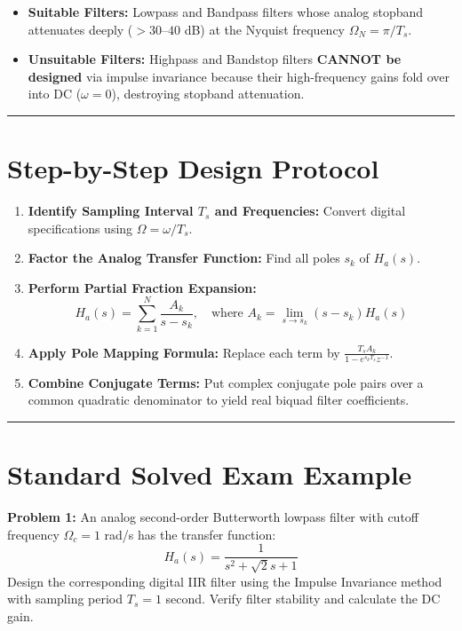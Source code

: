 \documentclass[11pt,a4paper]{article}
\begin{document}
\begin{itemize}
    \item \textbf{Suitable Filters:} Lowpass and Bandpass filters whose analog stopband attenuates deeply ($> 30\text{--}40$ dB) at the Nyquist frequency $\Omega_N = \pi/T_s$.
    \item \textbf{Unsuitable Filters:} Highpass and Bandstop filters \textbf{CANNOT be designed} via impulse invariance because their high-frequency gains fold over into DC ($\omega = 0$), destroying stopband attenuation.
\end{itemize}

\noindent\rule{\textwidth}{0.5pt}

\section{Step-by-Step Design Protocol}

\begin{enumerate}
    \item \textbf{Identify Sampling Interval $T_s$ and Frequencies:} Convert digital specifications using $\Omega = \omega / T_s$.
    \item \textbf{Factor the Analog Transfer Function:} Find all poles $s_k$ of $H_a(s)$.
    \item \textbf{Perform Partial Fraction Expansion:}
    \begin{equation}
    H_a(s) = \sum_{k=1}^N \frac{A_k}{s - s_k}, \quad \text{where } A_k = \lim_{s \to s_k} (s - s_k) H_a(s)
    \end{equation}
    \item \textbf{Apply Pole Mapping Formula:} Replace each term by $\frac{T_s A_k}{1 - e^{s_k T_s} z^{-1}}$.
    \item \textbf{Combine Conjugate Terms:} Put complex conjugate pole pairs over a common quadratic denominator to yield real biquad filter coefficients.
\end{enumerate}

\noindent\rule{\textwidth}{0.5pt}

\section{Standard Solved Exam Example}

\textbf{Problem 1:} An analog second-order Butterworth lowpass filter with cutoff frequency $\Omega_c = 1$ rad/s has the transfer function:
\begin{equation}
H_a(s) = \frac{1}{s^2 + \sqrt{2} s + 1}
\end{equation}
Design the corresponding digital IIR filter using the Impulse Invariance method with sampling period $T_s = 1$ second. Verify filter stability and calculate the DC gain.
\end{document}
